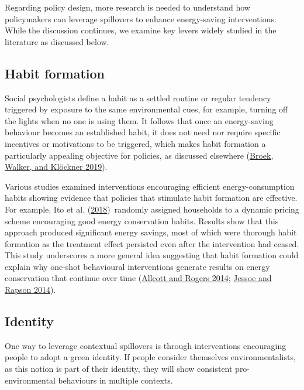 \documentclass[
  11pt,
]{article}
\begin{document}
Regarding policy design, more research is needed to understand how
policymakers can leverage spillovers to enhance energy-saving
interventions. While the discussion continues, we examine key levers
widely studied in the literature as discussed below.

\hypertarget{habit-formation}{%
\subsection{Habit formation}\label{habit-formation}}

Social psychologists define a habit as a settled routine or regular
tendency triggered by exposure to the same environmental cues, for
example, turning off the lights when no one is using them. It follows
that once an energy-saving behaviour becomes an established habit, it
does not need nor require specific incentives or motivations to be
triggered, which makes habit formation a particularly appealing
objective for policies, as discussed elsewhere
(\protect\hyperlink{ref-van2019drivers}{Broek, Walker, and Klöckner
2019}).

Various studies examined interventions encouraging efficient
energy-consumption habits showing evidence that policies that stimulate
habit formation are effective. For example, Ito et al.
(\protect\hyperlink{ref-ito2018moral}{2018})~randomly assigned
households to a dynamic pricing scheme encouraging good energy
conservation habits. Results show that this approach produced
significant energy savings, most of which were thorough habit formation
as the treatment effect persisted even after the intervention had
ceased. This study underscores a more general idea suggesting that habit
formation could explain why one-shot behavioural interventions generate
results on energy conservation that continue over time
(\protect\hyperlink{ref-allcott2014short}{Allcott and Rogers 2014};
\protect\hyperlink{ref-jessoe2014knowledge}{Jessoe and Rapson 2014}).

\hypertarget{identity}{%
\subsection{Identity}\label{identity}}

One way to leverage contextual spillovers is through interventions
encouraging people to adopt a green identity. If people consider
themselves environmentalists, as this notion is part of their identity,
they will show consistent pro-environmental behaviours in multiple
contexts.
\end{document}
